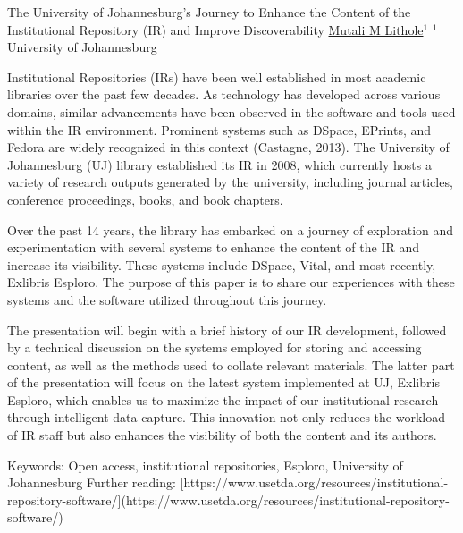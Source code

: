 \begin{abstract_online}{The University of Johannesburg’s Journey to Enhance the Content of the Institutional Repository (IR) and Improve Discoverability}{%
    \underline{Mutali M Lithole}$^{1}$}{%
    }{%
    $^1$ University of Johannesburg\newline{}
}

Institutional Repositories (IRs) have been well established in most academic libraries over the past few decades. As technology has developed across various domains, similar advancements have been observed in the software and tools used within the IR environment. Prominent systems such as DSpace, EPrints, and Fedora are widely recognized in this context (Castagne, 2013). The University of Johannesburg (UJ) library established its IR in 2008, which currently hosts a variety of research outputs generated by the university, including journal articles, conference proceedings, books, and book chapters.

Over the past 14 years, the library has embarked on a journey of exploration and experimentation with several systems to enhance the content of the IR and increase its visibility. These systems include DSpace, Vital, and most recently, Exlibris Esploro. The purpose of this paper is to share our experiences with these systems and the software utilized throughout this journey. 

The presentation will begin with a brief history of our IR development, followed by a technical discussion on the systems employed for storing and accessing content, as well as the methods used to collate relevant materials. The latter part of the presentation will focus on the latest system implemented at UJ, Exlibris Esploro, which enables us to maximize the impact of our institutional research through intelligent data capture. This innovation not only reduces the workload of IR staff but also enhances the visibility of both the content and its authors.

Keywords: Open access, institutional repositories, Esploro, University of Johannesburg  
Further reading: [https://www.usetda.org/resources/institutional-repository-software/](https://www.usetda.org/resources/institutional-repository-software/)
\end{abstract_online}

